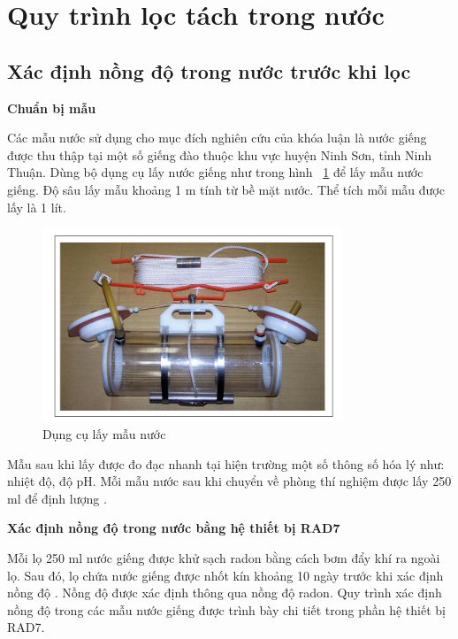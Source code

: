 \section{Quy trình lọc tách  trong nước }

\subsection{Xác định nồng độ  trong nước trước khi lọc}
\textbf{Chuẩn bị mẫu}

Các mẫu nước sử dụng cho mục đích nghiên cứu của khóa luận là nước giếng được thu thập tại một số giếng đào thuộc khu vực huyện Ninh Sơn, tỉnh Ninh Thuận. Dùng bộ dụng cụ lấy nước giếng như trong hình ~\ref{figure:EquipmentForMnO2} để lấy mẫu nước giếng. Độ sâu lấy mẫu khoảng 1 m tính từ bề mặt nước. Thể tích mỗi mẫu được lấy là 1 lít.

\begin{figure}[htbp]
    \centering
    \includegraphics[width=0.8\textwidth]{Image/MnO2-Figure4.png}
    \caption{Dụng cụ lấy mẫu nước}
    \label{figure:EquipmentForMnO2}
\end{figure}

Mẫu sau khi lấy được đo đạc nhanh tại hiện trường một số thông số hóa lý như: nhiệt độ, độ pH. Mỗi mẫu nước sau khi chuyển về phòng thí nghiệm được lấy 250 ml để định lượng . 

\textbf{Xác định nồng độ  trong nước bằng hệ thiết bị RAD7} 


Mỗi lọ 250 ml nước giếng được khử sạch radon bằng cách bơm đẩy khí ra ngoài lọ. Sau đó, lọ chứa nước giếng được nhốt kín khoảng 10 ngày trước khi xác định nồng độ . Nồng độ  được xác định thông qua nồng độ radon. Quy trình xác định nồng độ  trong các mẫu nước giếng được trình bày chi tiết trong phần hệ thiết bị RAD7.  

